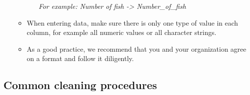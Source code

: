 \documentclass[
]{book}
\begin{document}
\begin{enumerate}
\begin{itemize}
\begin{itemize}
      \emph{For example: Number of fish -\textgreater{} Number\_of\_fish}
    \end{itemize}
  \item
    When entering data, make sure there is only one type of value in each column, for example all numeric values or all character strings.
  \item
    As a good practice, we recommend that you and your organization agree on a format and follow it diligently.
  \end{itemize}
\end{enumerate}

\hypertarget{common-cleaning-procedures}{%
\subsection{Common cleaning procedures}\label{common-cleaning-procedures}}
\end{document}

